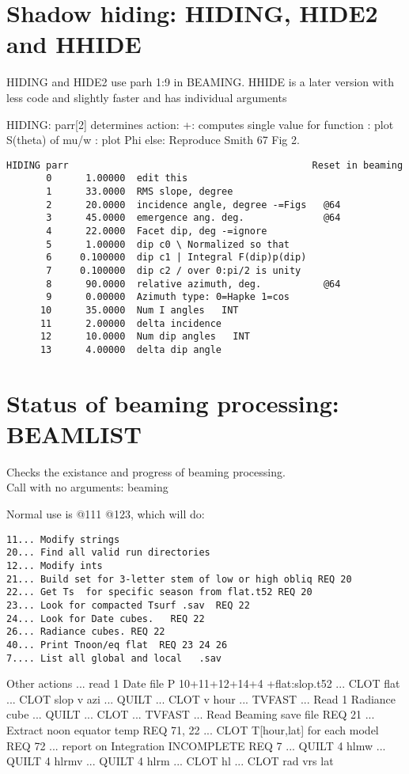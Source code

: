 \documentclass{article}
\begin{document}
\section{Shadow hiding: HIDING, HIDE2 and HHIDE}

HIDING and HIDE2 use parh 1:9 in BEAMING.  HHIDE is a later version with less code and slightly faster and has individual arguments

HIDING: parr[2] determines action:
 +: computes single value for function
: plot S(theta) of mu/w
:  plot Phi
\qi else: Reproduce Smith 67 Fig 2. 

\vspace{-3.mm} 
\begin{verbatim}
HIDING parr                                           Reset in beaming
       0      1.00000  edit this
       1      33.0000  RMS slope, degree
       2      20.0000  incidence angle, degree -=Figs   @64
       3      45.0000  emergence ang. deg.              @64
       4      22.0000  Facet dip, deg -=ignore
       5      1.00000  dip c0 \ Normalized so that
       6     0.100000  dip c1 | Integral F(dip)p(dip)
       7     0.100000  dip c2 / over 0:pi/2 is unity
       8      90.0000  relative azimuth, deg.           @64
       9      0.00000  Azimuth type: 0=Hapke 1=cos
      10      35.0000  Num I angles   INT
      11      2.00000  delta incidence
      12      10.0000  Num dip angles   INT
      13      4.00000  delta dip angle
\end{verbatim}

\section{Status of beaming processing: BEAMLIST }
Checks the existance and progress of beaming processing.
\\ Call with no arguments:  beaming

Normal use is @111 @123, which will do:
\vspace{-3.mm} 
\begin{verbatim}
11... Modify strings
20... Find all valid run directories
12... Modify ints
21... Build set for 3-letter stem of low or high obliq REQ 20
22... Get Ts  for specific season from flat.t52 REQ 20
23... Look for compacted Tsurf .sav  REQ 22
24... Look for Date cubes.   REQ 22
26... Radiance cubes. REQ 22
40... Print Tnoon/eq flat  REQ 23 24 26
7.... List all global and local   .sav
\end{verbatim}
Other actions 
\qi {}... read 1 Date file   P 10+11+12+14+4  +flat:slop.t52 
\qi {}... CLOT flat
\qi {}... CLOT slop v azi
\qi {}... QUILT
\qi {}... CLOT v hour  
\qi {}... TVFAST
\qi {}... Read 1 Radiance cube
\qi {}... QUILT
\qi {}... CLOT
\qi {}... TVFAST
\qi {}... Read Beaming save file  REQ 21
\qi {}... Extract noon equator temp  REQ 71, 22
\qi {}... CLOT T[hour,lat] for each model REQ 72
\qi {}... report on Integration  INCOMPLETE REQ 7
\qi {}... QUILT 4 hlmw
\qi {}... QUILT 4 hlrmv
\qi {}... QUILT 4 hlrm
\qi {}... CLOT hl
\qi {}... CLOT rad vrs lat
\end{document}

